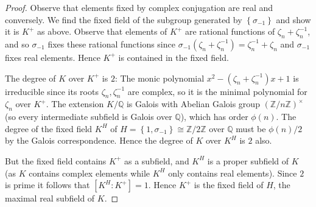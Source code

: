 \documentclass[11pt]{article}
\newcommand{\cbr}[1]{\left\{#1\right\}}
\begin{document}
\begin{enumerate}
\begin{proof}
        Observe that elements fixed by complex conjugation are real and conversely. We find the fixed field of the subgroup generated by $\cbr{\sigma_{-1}}$ and show it is $K^+$ as above. Observe that elements of $K^+$ are rational functions of $\zeta_n+\zeta_n^{-1}$, and so $\sigma_{-1}$ fixes these rational functions since $\sigma_{-1}(\zeta_n+\zeta_n^{-1}) = \zeta_n^{-1}+\zeta_n$ and $\sigma_{-1}$ fixes real elements. Hence $K^+$ is contained in the fixed field.

        The degree of $K$ over $K^+$ is $2$: The monic polynomial $x^2-(\zeta_n+\zeta_n^{-1})x+1$ is irreducible since its roots $\zeta_n,\zeta_n^{-1}$ are complex, so it is the minimal polynomial for $\zeta_n$ over $K^+$. The extension $K/\mathbb{Q}$ is Galois with Abelian Galois group $(\mathbb{Z}/n\mathbb{Z})^\times$ (so every intermediate subfield is Galois over $\mathbb{Q}$), which has order $\phi(n)$. The degree of the fixed field $K^H$ of $H = \cbr{1,\sigma_{-1}}\cong \mathbb{Z}/2\mathbb{Z}$ over $\mathbb{Q}$ must be $\phi(n)/2$ by the Galois correspondence. Hence the degree of $K$ over $K^H$ is $2$ also.

        But the fixed field contains $K^+$ as a subfield, and $K^H$ is a proper subfield of $K$ (as $K$ contains complex elements while $K^H$ only contains real elements). Since $2$ is prime it follows that $[K^H\colon K^+] = 1$. Hence $K^+$ is the fixed field of $H$, the maximal real subfield of $K$.
    \end{proof}
\end{enumerate}
\end{document}
